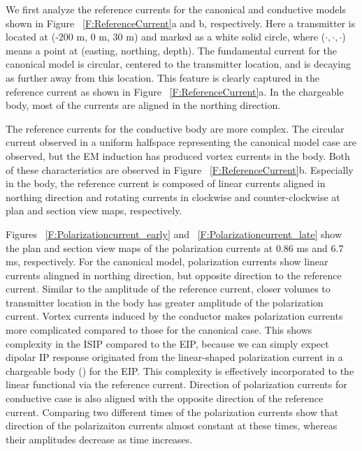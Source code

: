 \documentclass[extra,mreferee]{gji}
\begin{document}
We first analyze the reference currents for the canonical and conductive models shown in Figure ~\ref{F:ReferenceCurrent}a and b, respectively. 
Here a transmitter is located at (-200 m, 0 m, 30 m) and marked as a white solid circle, where ($\cdot, \cdot, \cdot$) means a point at (easting, northing, depth).  
The fundamental current for the canonical model is circular, centered to the transmitter location, and is decaying as further away from this location. This feature is clearly captured in the reference current as shown in Figure ~\ref{F:ReferenceCurrent}a. 
In the chargeable body, most of the currents are aligned in the northing direction. 

The reference currents for the conductive body are more complex. The circular current observed in a uniform halfspace representing the canonical model case are observed, but the EM induction has produced vortex currents in the body. Both of these characteristics are observed in Figure ~\ref{F:ReferenceCurrent}b.   
Especially in the body, the reference current is composed of linear currents aligned in northing direction and rotating currents in clockwise and counter-clockwise at plan and section view maps, respectively. 

Figures ~\ref{F:Polarizationcurrent_early} and ~\ref{F:Polarizationcurrent_late} show the plan and section view maps of the polarization currents at 0.86 ms and 6.7 ms, respectively. 
For the canonical model, polarization currents show linear currents alingned in northing direction, but opposite direction to the reference current. 
Similar to the amplitude of the reference current, closer volumes to transmitter location in the body has greater amplitude of the polarization current. 
Vortex currents induced by the conductor makes polarization currents more complicated compared to those for the canonical case. 
This shows complexity in the ISIP compared to the EIP, because we can simply expect dipolar IP response originated from the linear-shaped polarization current in a chargeable body (\cite{seigel1959}) for the EIP.
This complexity is effectively incorporated to the linear functional via the reference current. 
Direction of polarization currents for conductive case is also aligned with the opposite direction of the reference current.
Comparing two different times of the polarization currents show that direction of the polarizaiton currents almost constant at these times, whereas their amplitudes decrease as time increases. 
\end{document}
